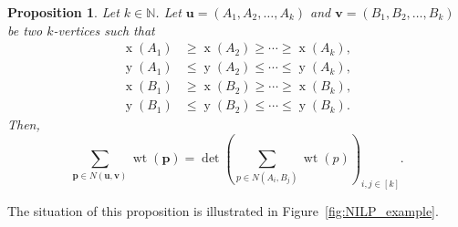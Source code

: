 \documentclass[reqno]{amsart}
\newcommand{\0}{\phantom{c}}
\DeclareMathOperator{\wt}{wt} %
\DeclareMathOperator{\xcoord}{x} %
\DeclareMathOperator{\ycoord}{y} %
\newcommand{\pp}{\mathbf{p}}
\newcommand{\uu}{\mathbf{u}}
\newcommand{\vv}{\mathbf{v}}
\newcommand{\NN}{\mathbb{N}}
\let\sumnonlimits\sum
\renewcommand{\sum}{\sumnonlimits\limits}
\newcommand{\tup}[1]{\left( #1 \right)}
\newcommand{\ive}[1]{\left[ #1 \right]}
\theoremstyle{plain}
\newtheorem{prop}[thm]{Proposition}
\theoremstyle{definition}
\numberwithin{equation}{section}
\begin{document}
\begin{prop}
\label{prop.LGV.concrete}
Let $k \in \NN$.
Let $\uu = \tup{A_1, A_2, \dotsc, A_k}$ and $\vv = \tup{B_1,B_2, \dotsc, B_k}$ be two $k$-vertices such that
\begin{align*}
\xcoord(A_1) & \geq \xcoord(A_2) \geq \cdots \geq \xcoord(A_k), \\
\ycoord(A_1) & \leq \ycoord(A_2) \leq \cdots \leq \ycoord(A_k), \\
\xcoord(B_1) & \geq \xcoord(B_2) \geq \cdots \geq \xcoord(B_k), \\
\ycoord(B_1) & \leq \ycoord(B_2) \leq \cdots \leq \ycoord(B_k).
\end{align*}
Then,
\[
\sum_{\pp \in N(\uu,\vv)} \wt(\pp) = \det\left( \sum_{p\in N(A_i,B_j) } \wt(p) \right)_{i, j \in \ive{k}} .
\]
\end{prop}

The situation of this proposition is illustrated in Figure~\ref{fig:NILP_example}.
\end{document}
